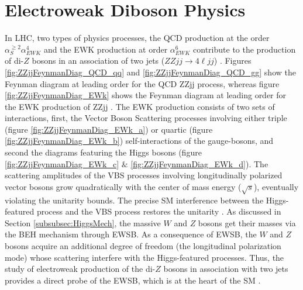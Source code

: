 \section{ Electroweak Diboson Physics }	
\label{sec:EWKPheno}

In LHC, two types of physics processes, the QCD production at the order $\alpha_{S}^{\geq 2} \alpha_{EWK}^{4}$ and the EWK production at order $\alpha_{EWK}^6$ contribute to the production of di-$Z$ bosons in an association of two jets ($ZZjj \rightarrow 4\ell jj$) \cite{CMSRun2ZZjj}. Figures \ref{fig:ZZjjFeynmanDiag_QCD_qq} and \ref{fig:ZZjjFeynmanDiag_QCD_gg} show the Feynman diagram at leading order for the QCD ZZjj process, whereas figure \ref{fig:ZZjjFeynmanDiag_EWk} shows the Feynman diagram at leading order for the EWK production of ZZjj \cite{PowhegV2ZZjj}. The EWK production consists of two sets of interactions, first, the Vector Boson Scattering processes involving either triple (figure \ref{fig:ZZjjFeynmanDiag_EWk_a}) or quartic (figure \ref{fig:ZZjjFeynmanDiag_EWk_b}) self-interactions of the gauge-bosons, and second the diagrams featuring the Higgs bosons (figure \ref{fig:ZZjjFeynmanDiag_EWk_c} $\&$ \ref{fig:ZZjjFeynmanDiag_EWk_d}). The scattering amplitudes of the VBS processes involving longitudinally polarized vector bosons grow quadratically with the center of mass energy ($\sqrt{s}$), eventually violating the unitarity bounds. The precise SM interference between the Higgs-featured process and the VBS process restores the unitarity  \cite{VBSWWWW}. As discussed in Section \ref{subsubsec:HiggsMech}, the massive $W$ and $Z$ bosons get their masses via the BEH mechanism through EWSB. As a consequence of EWSB, the $W$ and $Z$ bosons acquire an additional degree of freedom (the longitudinal polarization mode) whose scattering interfere with the Higgs-featured processes. Thus, the study of electroweak production of the di-$Z$ bosons in association with two jets provides a direct probe of the EWSB, which is at the heart of the SM \cite{CMSRun2ZZjj}. 

